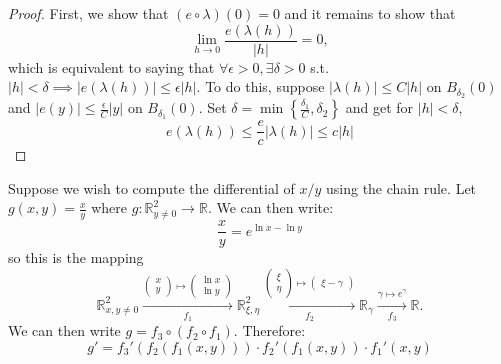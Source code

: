 \begin{itemize}
\begin{proof}
        First, we show that $(e\circ \lambda)(0) = 0$ and it remains to show that 
        \begin{equation}
            \lim_{h\to 0} \frac{e(\lambda(h))}{|h|} = 0,
        \end{equation}
        which is equivalent to saying that $\forall \epsilon > 0, \exists \delta > 0$ s.t. $|h| <\delta \implies |e(\lambda(h))| \le \epsilon |h|.$ To do this, suppose $|\lambda(h)| \le C|h|$ on $B_{\delta_2}(0)$ and $|e(y)| \le \frac{\epsilon}{C}|y|$ on $B_{\delta_1}(0).$ Set $\delta=\min\left\{\frac{\delta_1}{C},\delta_2\right\}$ and get for $|h| < \delta$, 
        \begin{equation}
            e(\lambda(h)) \le \frac{e}{c}|\lambda(h)| \le c|h|
        \end{equation}
    \end{proof}
    \begin{example}
        Suppose we wish to compute the differential of $x/y$ using the chain rule. Let $g(x,y) = \frac{x}{y}$ where $g:\mathbb{R}^2_{y\neq 0} \rightarrow \mathbb{R}$. We can then write:
        \begin{equation}
            \frac{x}{y} = e^{\ln x - \ln y}
        \end{equation}
        so this is the mapping 
        \begin{equation}
            \mathbb{R}^2_{x,y\neq 0} \xrightarrow[f_1]{\begin{pmatrix}
                x \\ y
            \end{pmatrix}\mapsto \begin{pmatrix}
                \ln x \\ \ln y
            \end{pmatrix}} \mathbb{R}^2_{\xi,\eta} \xrightarrow[f_2]{\begin{pmatrix}
                \xi \\ \eta
            \end{pmatrix}\mapsto \begin{pmatrix}
                \xi - \gamma
            \end{pmatrix}}\mathbb{R}_{\gamma} \xrightarrow[f_3]{\gamma \mapsto e^\gamma}\mathbb{R}.
        \end{equation}
        We can then write $g = f_3 \circ (f_2 \circ f_1).$ Therefore: 
        \begin{equation}
            g' = f_3'(f_2(f_1(x,y))) \cdot f_2'(f_1(x,y)) \cdot f_1'(x,y)
        \end{equation}

\end{example}
\end{itemize}
